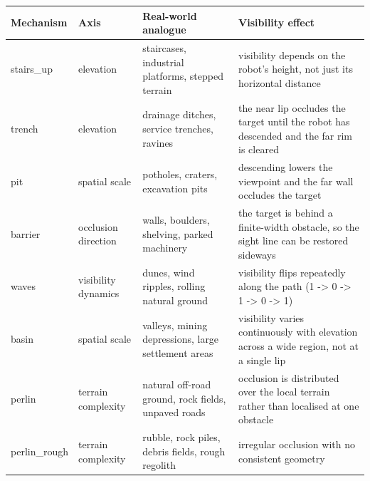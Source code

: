 \begin{tabular}{llp{3.0cm}p{3.4cm}}
\toprule
Mechanism & Axis & Real-world analogue & Visibility effect \\
\midrule
stairs\_up & elevation & staircases, industrial platforms, stepped terrain & visibility depends on the robot's height, not just its horizontal distance \\
trench & elevation & drainage ditches, service trenches, ravines & the near lip occludes the target until the robot has descended and the far rim is cleared \\
pit & spatial scale & potholes, craters, excavation pits & descending lowers the viewpoint and the far wall occludes the target \\
barrier & occlusion direction & walls, boulders, shelving, parked machinery & the target is behind a finite-width obstacle, so the sight line can be restored sideways \\
waves & visibility dynamics & dunes, wind ripples, rolling natural ground & visibility flips repeatedly along the path (1 -> 0 -> 1 -> 0 -> 1) \\
basin & spatial scale & valleys, mining depressions, large settlement areas & visibility varies continuously with elevation across a wide region, not at a single lip \\
perlin & terrain complexity & natural off-road ground, rock fields, unpaved roads & occlusion is distributed over the local terrain rather than localised at one obstacle \\
perlin\_rough & terrain complexity & rubble, rock piles, debris fields, rough regolith & irregular occlusion with no consistent geometry \\
\bottomrule
\end{tabular}
